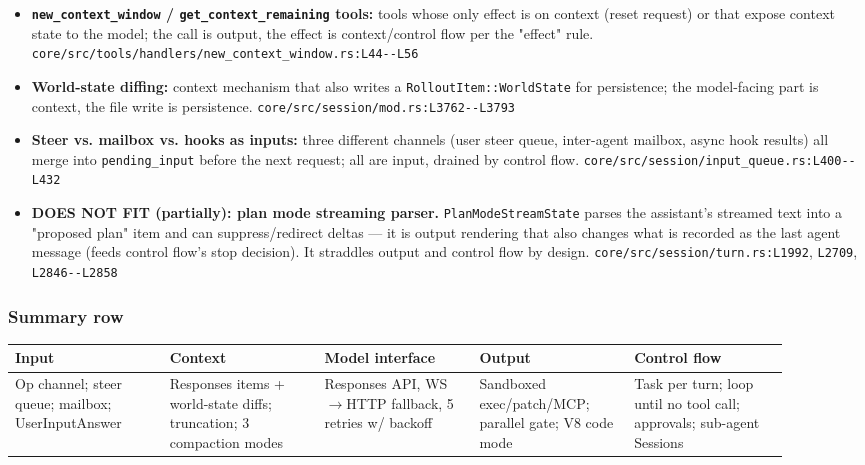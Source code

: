 \begin{itemize}
\item \textbf{\texttt{new\_\allowbreak{}context\_\allowbreak{}window} / \texttt{get\_\allowbreak{}context\_\allowbreak{}remaining} tools:} tools whose only effect is on context (reset request) or that expose context state to the model; the call is output, the effect is context/control flow per the "effect" rule. \texttt{core/\allowbreak{}src/\allowbreak{}tools/\allowbreak{}handlers/\allowbreak{}new\_\allowbreak{}context\_\allowbreak{}window.\allowbreak{}rs:\allowbreak{}L44-\allowbreak{}-\allowbreak{}L56}
\item \textbf{World-state diffing:} context mechanism that also writes a \texttt{RolloutItem:\allowbreak{}:\allowbreak{}WorldState} for persistence; the model-facing part is context, the file write is persistence. \texttt{core/\allowbreak{}src/\allowbreak{}session/\allowbreak{}mod.\allowbreak{}rs:\allowbreak{}L3762-\allowbreak{}-\allowbreak{}L3793}
\item \textbf{Steer vs. mailbox vs. hooks as inputs:} three different channels (user steer queue, inter-agent mailbox, async hook results) all merge into \texttt{pending\_\allowbreak{}input} before the next request; all are input, drained by control flow. \texttt{core/\allowbreak{}src/\allowbreak{}session/\allowbreak{}input\_\allowbreak{}queue.\allowbreak{}rs:\allowbreak{}L400-\allowbreak{}-\allowbreak{}L432}
\item \textbf{DOES NOT FIT (partially): plan mode streaming parser.} \texttt{PlanModeStreamState} parses the assistant's streamed text into a "proposed plan" item and can suppress/redirect deltas --- it is output rendering that also changes what is recorded as the last agent message (feeds control flow's stop decision). It straddles output and control flow by design. \texttt{core/\allowbreak{}src/\allowbreak{}session/\allowbreak{}turn.\allowbreak{}rs:\allowbreak{}L1992}, \texttt{L2709}, \texttt{L2846-\allowbreak{}-\allowbreak{}L2858}
\end{itemize}

\subsubsection*{Summary row}
\begin{longtable}{@{}p{0.18\linewidth}p{0.18\linewidth}p{0.18\linewidth}p{0.18\linewidth}p{0.18\linewidth}@{}}
\toprule \textbf{Input} & \textbf{Context} & \textbf{Model interface} & \textbf{Output} & \textbf{Control flow} \\ \midrule \endhead
Op channel; steer queue; mailbox; UserInputAnswer & Responses items + world-state diffs; truncation; 3 compaction modes & Responses API, WS$\rightarrow$HTTP fallback, 5 retries w/ backoff & Sandboxed exec/patch/MCP; parallel gate; V8 code mode & Task per turn; loop until no tool call; approvals; sub-agent Sessions \\
\bottomrule \end{longtable}


